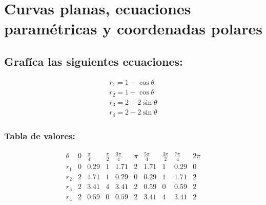 \documentclass[letterpaper, 12pt]{article}
\begin{document}
\setcounter{page}{1}
\thispagestyle{fancy}
\section*{Curvas planas, ecuaciones paramétricas y coordenadas polares}
\subsection*{Grafíca las siguientes ecuaciones: }
\[\begin{matrix}
    r_1=1-\cos\theta\\
    r_2=1+\cos\theta\\
    r_3=2+2\sin\theta\\
    r_4=2-2\sin\theta
\end{matrix}\]
\subsubsection*{Tabla de valores:}
\[\begin{matrix}
    \theta&0&\frac{\pi}{4}&\frac{\pi}{2}&\frac{3\pi}{4}&\pi&\frac{5\pi}{4}&\frac{3\pi}{2}&\frac{7\pi}{4}&2\pi\\
    r_1&0&0.29&1&1.71&2&1.71&1&0.29&0\\
    r_2&2&1.71&1&0.29&0&0.29&1&1.71&2\\
    r_3&2&3.41&4&3.41&2&0.59&0&0.59&2\\
    r_4&2&0.59&0&0.59&2&3.41&4&3.41&2
\end{matrix}\]
\end{document}
